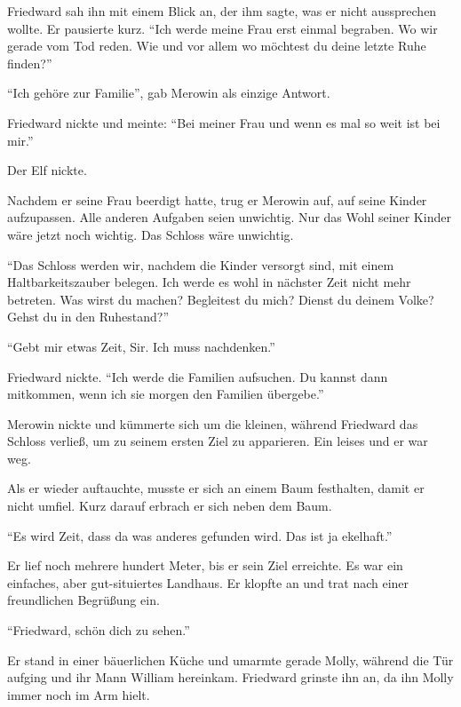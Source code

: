 Friedward sah ihn mit einem Blick an, der ihm sagte, was er nicht aussprechen wollte.  Er pausierte kurz. \enquote{Ich werde meine Frau erst einmal begraben. Wo wir gerade vom Tod reden. Wie und vor allem wo möchtest du deine letzte Ruhe finden?}

\enquote{Ich gehöre zur Familie}, gab Merowin als einzige Antwort.

Friedward nickte und meinte: \enquote{Bei meiner Frau und \gst wenn es mal so weit ist \gst bei mir.}

Der Elf nickte.

\trenn

Nachdem er seine Frau beerdigt hatte, trug er Merowin auf, auf seine Kinder aufzupassen. Alle anderen Aufgaben seien unwichtig. Nur das Wohl seiner Kinder wäre jetzt noch wichtig. Das Schloss wäre unwichtig.

\enquote{Das Schloss werden wir, nachdem die Kinder versorgt sind, mit einem Haltbarkeitszauber belegen. Ich werde es wohl in nächster Zeit nicht mehr betreten. Was wirst du machen? Begleitest du mich? Dienst du deinem Volke? Gehst du in den Ruhestand?}

\enquote{Gebt mir etwas Zeit, Sir. Ich muss nachdenken.}

Friedward nickte. \enquote{Ich werde die Familien aufsuchen. Du kannst dann mitkommen, wenn ich sie morgen den Familien übergebe.}

Merowin nickte und kümmerte sich um die kleinen, während Friedward das Schloss verließ, um zu seinem ersten Ziel zu apparieren. Ein leises  und er war weg.

Als er wieder auftauchte, musste er sich an einem Baum festhalten, damit er nicht umfiel. Kurz darauf erbrach er sich neben dem Baum.

\enquote{Es wird Zeit, dass da was anderes gefunden wird. Das ist ja ekelhaft.}

Er lief noch mehrere hundert Meter, bis er sein Ziel erreichte. Es war ein einfaches, aber gut-situiertes Landhaus. Er klopfte an und trat nach einer freundlichen Begrüßung ein.

\enquote{Friedward, schön dich zu sehen.}

Er stand in einer bäuerlichen Küche und umarmte gerade Molly, während die Tür aufging und ihr Mann William hereinkam. Friedward grinste ihn an, da ihn Molly immer noch im Arm hielt.

